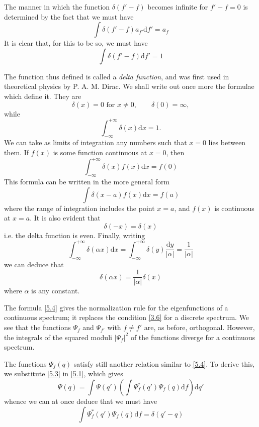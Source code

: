 The manner in which the function $ \delta(f'-f) $ becomes infinite for $ f'-f = 0 $ is determined by the fact that we must have
\[ \int \delta(f'-f)a_{f'}\mathrm{d}f'=a_f \]
It is clear that, for this to be so, we must have
\[ \int\delta(f'-f)\mathrm{d}f'=1 \]	
	
The function thus defined is called a \textit{delta function}, and was first used in theoretical physics by P. A. M. Dirac. We shall write out once more the formulae which define it. They are
\begin{equation}\label{5.5}
\delta(x)=0\text{ for }x\ne0,\qquad\delta(0)=\infty,
\end{equation}
while
\begin{equation}\label{5.6}
\int_{-\infty}^{+\infty}\delta(x)\mathrm{d}x=1.
\end{equation}	
We can take as limits of integration any numbers such that $ x = 0 $ lies between them. If $ f (x) $ is some function continuous at $ x = 0 $, then
\begin{equation}\label{5.7}
\int_{-\infty}^{+\infty} \delta(x)f(x)\mathrm{d}x=f(0)
\end{equation}	
This formula can be written in the more general form
\begin{equation}\label{5.8}
\int\delta(x-a)f(x)\mathrm{d}x=f(a)
\end{equation}	
where the range of integration includes the point $ x = a $, and $ f (x) $ is continuous at $ x = a $. It is also evident that
\begin{equation}\label{5.9}
\delta(-x)=\delta(x)
\end{equation}	
i.e. the delta function is even. Finally, writing
\[ \int_{-\infty}^{+\infty}\delta(\alpha x)\mathrm{d}x=\int_{-\infty}^{+\infty}\delta(y)\frac{\mathrm{d}y}{|\alpha|}=\frac{1}{|\alpha|}\]	
we can deduce that
\begin{equation}\label{5.10}
\delta(\alpha x)= \frac{1}{|\alpha|}\delta(x)
\end{equation}	
where $ \alpha $ is any constant.
	
The formula \eqref{5.4} gives the normalization rule for the eigenfunctions of a continuous spectrum; it replaces the condition \eqref{3.6} for a discrete spectrum. We see that the functions $ \Psi_f $ and $ \Psi_{f'} $ with $ f\ne f' $ are, as before, orthogonal. However, the integrals of the squared moduli $ |\Psi_{f}|^2 $ of the functions diverge for a continuous spectrum.
	
The functions $ \Psi_{f}(q) $ satisfy still another relation similar to \eqref{5.4}. To derive this, we substitute \eqref{5.3} in \eqref{5.1}, which gives
\[ \Psi(q)=\int\Psi(q')\left( \int\Psi_{f}^*(q')\Psi_{f}(q)\mathrm{d}f\right)\mathrm{d}q' \]	
whence we can at once deduce that we must have
\begin{equation}\label{5.11}
\int\Psi_{f}^*(q')\Psi_{f}(q)\mathrm{d}f=\delta(q'-q)
\end{equation}	
	
